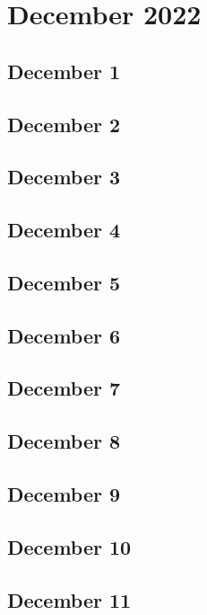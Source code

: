 \chapter{December 2022}

\section{December 1}

\section{December 2}

\section{December 3}

\section{December 4}

\section{December 5}

\section{December 6}

\section{December 7}

\section{December 8}

\section{December 9}

\section{December 10}

\section{December 11}

